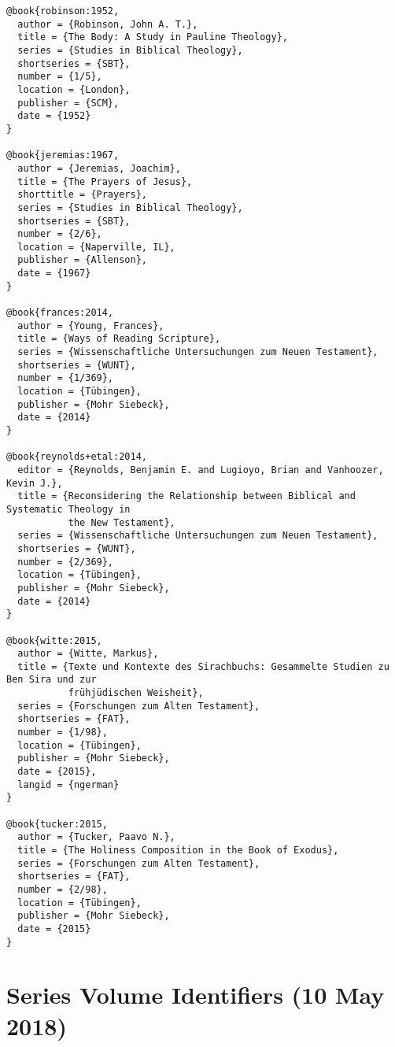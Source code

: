 \documentclass[a4paper]{article}
\begin{document}
\begin{verbatim}
@book{robinson:1952,
  author = {Robinson, John A. T.},
  title = {The Body: A Study in Pauline Theology},
  series = {Studies in Biblical Theology},
  shortseries = {SBT},
  number = {1/5},
  location = {London},
  publisher = {SCM},
  date = {1952}
}

@book{jeremias:1967,
  author = {Jeremias, Joachim},
  title = {The Prayers of Jesus},
  shorttitle = {Prayers},
  series = {Studies in Biblical Theology},
  shortseries = {SBT},
  number = {2/6},
  location = {Naperville, IL},
  publisher = {Allenson},
  date = {1967}
}

@book{frances:2014,
  author = {Young, Frances},
  title = {Ways of Reading Scripture},
  series = {Wissenschaftliche Untersuchungen zum Neuen Testament},
  shortseries = {WUNT},
  number = {1/369},
  location = {Tübingen},
  publisher = {Mohr Siebeck},
  date = {2014}
}

@book{reynolds+etal:2014,
  editor = {Reynolds, Benjamin E. and Lugioyo, Brian and Vanhoozer, Kevin J.},
  title = {Reconsidering the Relationship between Biblical and Systematic Theology in
           the New Testament},
  series = {Wissenschaftliche Untersuchungen zum Neuen Testament},
  shortseries = {WUNT},
  number = {2/369},
  location = {Tübingen},
  publisher = {Mohr Siebeck},
  date = {2014}
}

@book{witte:2015,
  author = {Witte, Markus},
  title = {Texte und Kontexte des Sirachbuchs: Gesammelte Studien zu Ben Sira und zur
           frühjüdischen Weisheit},
  series = {Forschungen zum Alten Testament},
  shortseries = {FAT},
  number = {1/98},
  location = {Tübingen},
  publisher = {Mohr Siebeck},
  date = {2015},
  langid = {ngerman}
}

@book{tucker:2015,
  author = {Tucker, Paavo N.},
  title = {The Holiness Composition in the Book of Exodus},
  series = {Forschungen zum Alten Testament},
  shortseries = {FAT},
  number = {2/98},
  location = {Tübingen},
  publisher = {Mohr Siebeck},
  date = {2015}
}
\end{verbatim}

\exampleabbreviations
\examplebibliography
{}

\section{Series Volume Identifiers (10 May 2018)}
\end{document}
